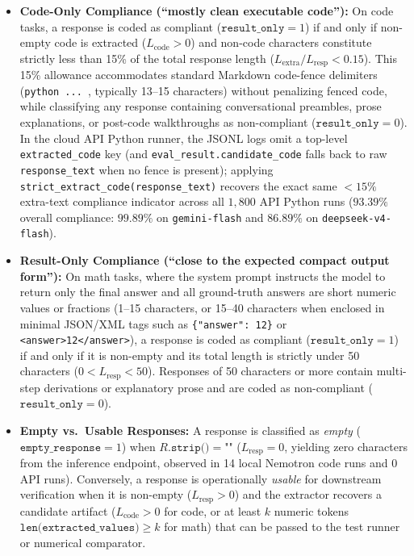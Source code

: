 \documentclass[a4paper,fleqn]{cas-sc}
\providecommand{\tightlist}{%
  \setlength{\itemsep}{0pt}\setlength{\parskip}{0pt}}
\begin{document}
\begin{itemize}
\tightlist
\item \textbf{Code-Only Compliance (``mostly clean executable code''):} On code tasks, a response is coded as compliant ($\texttt{result\_only} = 1$) if and only if non-empty code is extracted ($L_{\text{code}} > 0$) and non-code characters constitute strictly less than 15\% of the total response length ($L_{\text{extra}} / L_{\text{resp}} < 0.15$). This 15\% allowance accommodates standard Markdown code-fence delimiters (\texttt{\textasciigrave\textasciigrave\textasciigrave python ... \textasciigrave\textasciigrave\textasciigrave}, typically 13--15 characters) without penalizing fenced code, while classifying any response containing conversational preambles, prose explanations, or post-code walkthroughs as non-compliant ($\texttt{result\_only} = 0$). In the cloud API Python runner, the JSONL logs omit a top-level \texttt{extracted\_code} key (and \texttt{eval\_result.candidate\_code} falls back to raw \texttt{response\_text} when no fence is present); applying \texttt{strict\_extract\_code(response\_text)} recovers the exact same $<15\%$ extra-text compliance indicator across all $1{,}800$ API Python runs ($93.39\%$ overall compliance: $99.89\%$ on \texttt{gemini-flash} and $86.89\%$ on \texttt{deepseek-v4-flash}).
\item \textbf{Result-Only Compliance (``close to the expected compact output form''):} On math tasks, where the system prompt instructs the model to return only the final answer and all ground-truth answers are short numeric values or fractions (1--15 characters, or 15--40 characters when enclosed in minimal JSON/XML tags such as \texttt{\{"answer": 12\}} or \texttt{<answer>12</answer>}), a response is coded as compliant ($\texttt{result\_only} = 1$) if and only if it is non-empty and its total length is strictly under 50 characters ($0 < L_{\text{resp}} < 50$). Responses of 50 characters or more contain multi-step derivations or explanatory prose and are coded as non-compliant ($\texttt{result\_only} = 0$).
\item \textbf{Empty vs.\ Usable Responses:} A response is classified as \emph{empty} ($\texttt{empty\_response} = 1$) when $R\texttt{.strip()} = \texttt{""}$ ($L_{\text{resp}} = 0$, yielding zero characters from the inference endpoint, observed in 14 local Nemotron code runs and 0 API runs). Conversely, a response is operationally \emph{usable} for downstream verification when it is non-empty ($L_{\text{resp}} > 0$) and the extractor recovers a candidate artifact ($L_{\text{code}} > 0$ for code, or at least $k$ numeric tokens $\texttt{len(extracted\_values)} \ge k$ for math) that can be passed to the test runner or numerical comparator.

\end{itemize}
\end{document}
